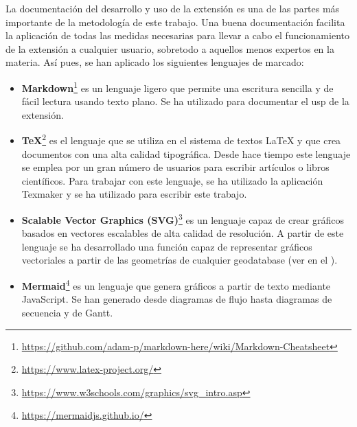 La documentación del desarrollo y uso de la extensión es una de las partes más importante de la metodología de este trabajo. Una buena documentación facilita la aplicación de todas las medidas necesarias para llevar a cabo el funcionamiento de la extensión a cualquier usuario, sobretodo a aquellos menos expertos en la materia. Así pues, se han aplicado los siguientes lenguajes de marcado:

\begin{itemize}
\item\textbf{Markdown}\footnote{\url{https://github.com/adam-p/markdown-here/wiki/Markdown-Cheatsheet}} es un lenguaje ligero que permite una escritura sencilla y de fácil lectura usando texto plano. Se ha utilizado para documentar el usp de la extensión.
\item\textbf{TeX}\footnote{\url{https://www.latex-project.org/}} es el lenguaje que se utiliza en el sistema de textos LaTeX y que crea documentos con una alta calidad tipográfica. Desde hace tiempo este lenguaje se emplea por un gran número de usuarios para escribir artículos o libros científicos. Para trabajar con este lenguaje, se ha utilizado la aplicación Texmaker y se ha utilizado para escribir este trabajo.
\item\textbf{Scalable Vector Graphics (SVG)}\footnote{\url{https://www.w3schools.com/graphics/svg_intro.asp}} es un lenguaje capaz de crear gráficos basados en vectores escalables de alta calidad de resolución. A partir de este lenguaje se ha desarrollado una función capaz de representar gráficos vectoriales a partir de las geometrías de cualquier geodatabase (ver en el ).
\item\textbf{Mermaid}\footnote{\url{https://mermaidjs.github.io/}} es un lenguaje que genera gráficos a partir de texto mediante JavaScript. Se han generado desde diagramas de flujo hasta diagramas de secuencia y de Gantt.
\end{itemize}
